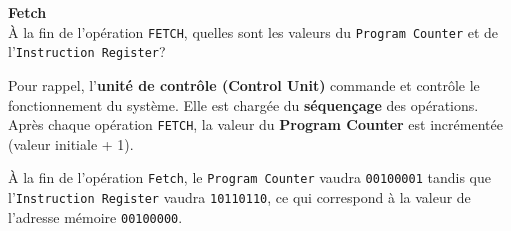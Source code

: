 \begin{Exercice}[10 minutes]\textbf{Fetch}\\
    À la fin de l'opération \lstinline{FETCH}, quelles sont les valeurs du \lstinline{Program Counter} et de l'\lstinline{Instruction Register}?

    \begin{conseil}
        Pour rappel, l'\textbf{unité de contrôle (Control Unit)} commande et contrôle le fonctionnement du système. Elle est chargée du \textbf{séquençage} des opérations. Après chaque opération \lstinline{FETCH}, la valeur du \textbf{Program Counter} est incrémentée (valeur initiale + 1).
    \end{conseil}

    \begin{solution}
        À la fin de l'opération \lstinline{Fetch}, le \lstinline{Program Counter} vaudra \lstinline{00100001} tandis que l'\lstinline{Instruction Register} vaudra \lstinline{10110110}, ce qui correspond à la valeur de l'adresse mémoire \lstinline{00100000}.
    \end{solution}
\end{Exercice}

